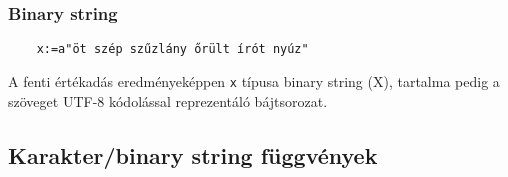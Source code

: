 \subsubsection{Binary string}
\begin{verbatim}
    x:=a"öt szép szűzlány őrült írót nyúz"
\end{verbatim}
A fenti értékadás eredményeképpen \verb!x! típusa binary string (X),
tartalma pedig a szöveget UTF-8 kódolással reprezentáló bájtsorozat.




\subsection{Karakter/binary string függvények}


